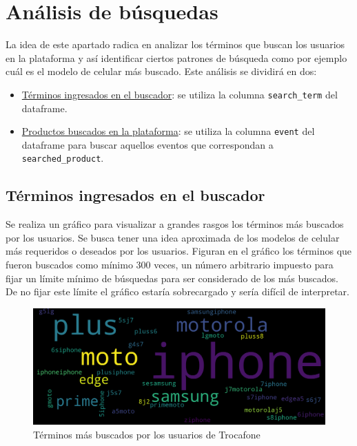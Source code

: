 \documentclass[a4paper]{article}
\begin{document}
\section{Análisis de búsquedas}

La idea de este apartado radica en analizar los términos que buscan los usuarios en la plataforma y así identificar ciertos patrones de búsqueda como por ejemplo cuál es el modelo de celular más buscado. Este análisis se dividirá en dos:

\begin{itemize}
	\item \underline{Términos ingresados en el buscador}: se utiliza la columna \texttt{search\_term} del dataframe.
	\item \underline{Productos buscados en la plataforma}: se utiliza la columna \texttt{event} del dataframe para buscar aquellos eventos que correspondan a \texttt{searched\_product}.
 \end{itemize}

\subsection{Términos ingresados en el buscador}

Se realiza un gráfico para visualizar a grandes rasgos los términos más buscados por los usuarios. Se busca tener una idea aproximada de los modelos de celular más requeridos o deseados por los usuarios. Figuran en el gráfico los términos que fueron buscados como mínimo 300 veces, un número arbitrario impuesto para fijar un límite mínimo de búsquedas para ser considerado de los más buscados. De no fijar este límite el gráfico estaría sobrecargado y sería difícil de interpretar.

\begin{figure}[h!]
	\includegraphics[width=\linewidth]{figures/07-search_terms-wordcloud.png}
	\caption{Términos más buscados por los usuarios de Trocafone}
	\label{searchedterm}
\end{figure}
\end{document}
